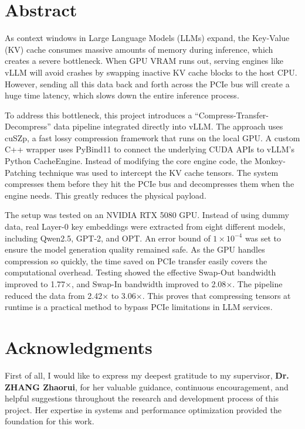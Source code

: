 \documentclass{polyu-comp}
\begin{document}
\printCompCover

\clearpage
\section*{Abstract}
As context windows in Large Language Models (LLMs) expand, the Key-Value (KV) cache consumes massive amounts of memory during inference, which creates a severe bottleneck. When GPU VRAM runs out, serving engines like vLLM will avoid crashes by swapping inactive KV cache blocks to the host CPU. However, sending all this data back and forth across the PCIe bus will create a huge time latency, which slows down the entire inference process.

To address this bottleneck, this project introduces a ``Compress-Transfer-Decompress'' data pipeline integrated directly into vLLM. The approach uses cuSZp, a fast lossy compression framework that runs on the local GPU. A custom C++ wrapper uses PyBind11 to connect the underlying CUDA APIs to vLLM's Python CacheEngine. Instead of modifying the core engine code, the Monkey-Patching technique was used to intercept the KV cache tensors. The system compresses them before they hit the PCIe bus and decompresses them when the engine needs. This greatly reduces the physical payload.

The setup was tested on an NVIDIA RTX 5080 GPU. Instead of using dummy data, real Layer-0 key embeddings were extracted from eight different models, including Qwen2.5, GPT-2, and OPT. An error bound of $1 \times 10^{-4}$ was set to ensure the model generation quality remained safe. As the GPU handles compression so quickly, the time saved on PCIe transfer easily covers the computational overhead. Testing showed the effective Swap-Out bandwidth improved to 1.77$\times$, and Swap-In bandwidth improved to 2.08$\times$. The pipeline reduced the data from 2.42$\times$ to 3.06$\times$. This proves that compressing tensors at runtime is a practical method to bypass PCIe limitations in LLM services.


\clearpage
\section*{Acknowledgments}

First of all, I would like to express my deepest gratitude to my supervisor, \textbf{Dr. ZHANG Zhaorui}, for her valuable guidance, continuous encouragement, and helpful suggestions throughout the research and development process of this project. Her expertise in systems and performance optimization provided the foundation for this work.
\end{document}

